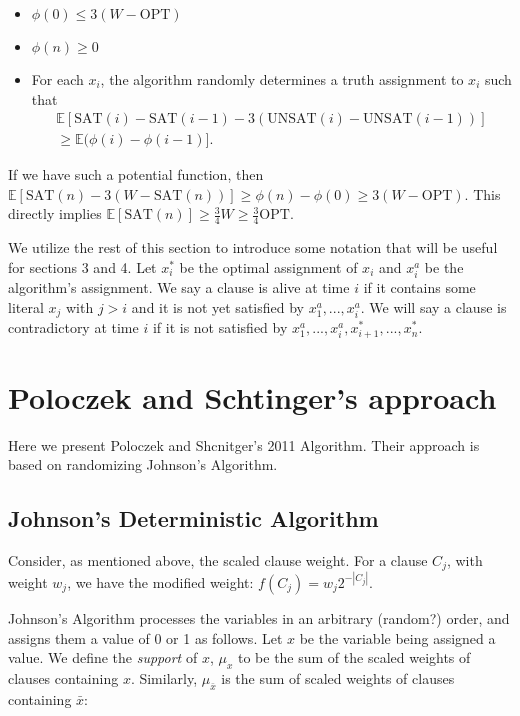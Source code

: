 \documentclass[11pt,letter]{article}
\begin{document}
\begin{itemize}
	\item $\phi(0) \leq 3(W-\mathrm{OPT})$
	\item $\phi(n) \geq 0$
	\item For each $x_i$, the algorithm randomly determines a truth assignment to $x_i$ such that
\begin{equation}
\begin{aligned}
\label{eq:2}
\mathbb{E}[\mathrm{SAT}(i) - \mathrm{SAT}(i-1) - 3\left(\mathrm{UNSAT}(i)-\mathrm{UNSAT}(i-1)\right)] \\
\geq \mathbb{E}(\phi(i) - \phi(i-1)].
\end{aligned}
\end{equation}
\end{itemize}

If we have such a potential function, then $\mathbb{E}[\mathrm{SAT}(n)- 3\left(W-\mathrm{SAT}(n)\right)] \geq \phi(n) - \phi(0) \geq 3(W-\mathrm{OPT})$.
This directly implies $\mathbb{E}[\mathrm{SAT}(n)] \geq \frac{3}{4} W \geq \frac{3}{4} \mathrm{OPT}$.

We utilize the rest of this section to introduce some notation that will be useful for sections 3 and 4.
Let $x_i^*$ be the optimal assignment of $x_i$ and $x_i^{a}$ be the algorithm's assignment. We say a clause is alive
at time $i$ if it contains some literal $x_j$ with $j > i$ and it is not yet satisfied by $x_1^a,...,x_i^a$.
We will say a clause is contradictory at time $i$ if it is not satisfied by $x_1^a,...,x_i^a,x_{i+1}^*,...,x_n^*$.


\section{Poloczek and Schtinger's approach}\label{S:PS}

Here we present Poloczek and Shcnitger's 2011 Algorithm. Their approach is based on randomizing Johnson's Algorithm.

\subsection{Johnson's Deterministic Algorithm}

Consider, as mentioned above, the scaled clause weight. For a clause $C_j$, with weight $w_j$, we have the modified weight:  $f(C_j) = w_j 2^{-|C_j|}$.

Johnson's Algorithm processes the variables in an arbitrary (random?) order, and assigns them a value of 0 or 1 as follows. Let $x$ be the variable being assigned a value. We define the \emph{support} of $x$, $\mu_x$ to be the sum of the scaled weights of clauses containing $x$. Similarly, $\mu_{\bar{x}}$ is the sum of scaled weights of clauses containing $\bar{x}$:
\end{document}

